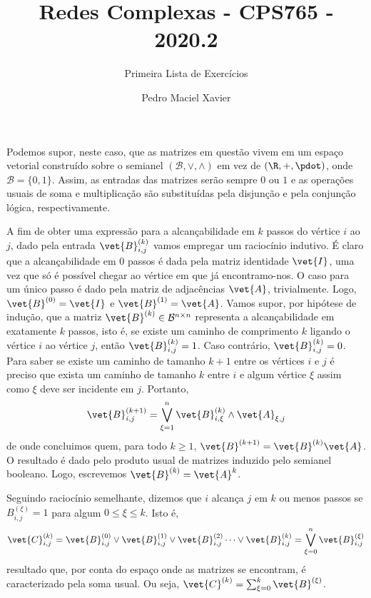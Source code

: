 \documentclass[l15, tikzdraw]{homework}
\title{Redes Complexas - CPS765 - 2020.2}
\subtitle{Primeira Lista de Exercícios}
\author{Pedro Maciel Xavier}
\begin{document}

	Podemos supor, neste caso, que as matrizes em questão vivem em um espaço vetorial construído sobre o semianel $(\mathcal{B}, \vee, \wedge)$ em vez de $(\R, +, \pdot)$, onde $\mathcal{B} = \{0, 1\}$. Assim, as entradas das matrizes serão sempre $0$ ou $1$ e as operações usuais de soma e multiplicação são substituídas pela disjunção e pela conjunção lógica, respectivamente.
	
	\subsubquest%
	A fim de obter uma expressão para a alcançabilidade em $k$ passos do vértice $i$ ao $j$, dado pela entrada $\vet{B}_{i, j}^{(k)}$ vamos empregar um raciocínio indutivo. É claro que a alcançabilidade em $0$ passos é dada pela matriz identidade $\vet{I}$, uma vez que só é possível chegar ao vértice em que já encontramo-nos. O caso para um único passo é dado pela matriz de adjacências $\vet{A}$, trivialmente. Logo, $\vet{B}^{(0)} = \vet{I}$ e $\vet{B}^{(1)} = \vet{A}$. Vamos supor, por hipótese de indução, que a matriz $\vet{B}^{(k)} \in \mathcal{B}^{n \times n}$ representa a alcançabilidade em exatamente $k$ passos, isto é, se existe um caminho de comprimento $k$ ligando o vértice $i$ ao vértice $j$, então $\vet{B}^{(k)}_{i, j} = 1$. Caso contrário, $\vet{B}^{(k)}_{i, j} = 0$. Para saber se existe um caminho de tamanho $k + 1$ entre os vértices $i$ e $j$ é preciso que exista um caminho de tamanho $k$ entre $i$ e algum vértice $\xi$ assim como $\xi$ deve ser incidente em $j$. Portanto,%
		$$\vet{B}^{(k + 1)}_{i, j} = \bigvee_{\xi = 1}^{n} \vet{B}^{(k)}_{i, \xi} \wedge \vet{A}_{\xi, j}$$
	de onde concluimos quem, para todo $k \ge 1$, $\vet{B}^{(k + 1)}= \vet{B}^{(k)} \vet{A}$. O resultado é dado pelo produto usual de matrizes induzido pelo semianel booleano. Logo, escrevemos $\vet{B}^{(k)} = \vet{A}^{k}$.
	
	\subsubquest%
	Seguindo raciocínio semelhante, dizemos que $i$ alcança $j$ em $k$ ou menos passos se $B^{(\xi)}_{i,j} = 1$ para algum $0 \le \xi \le k$. Isto é,%
		$$\vet{C}_{i, j}^{(k)} = \vet{B}_{i, j}^{(0)} \vee \vet{B}_{i, j}^{(1)} \vee \vet{B}_{i, j}^{(2)} \dots \vee \vet{B}_{i, j}^{(k)} = \bigvee_{\xi = 0}^{n} \vet{B}_{i, j}^{(\xi)}$$
	resultado que, por conta do espaço onde as matrizes se encontram, é caracterizado pela soma usual. Ou seja, $\vet{C}^{(k)} = \sum_{\xi=0}^{k} \vet{B}^{(\xi)}$.
\end{document}

